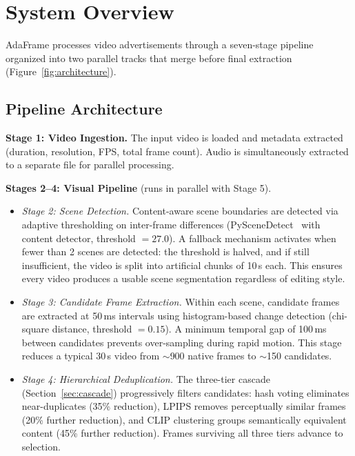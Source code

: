 \section{System Overview}
\label{sec:system_overview}

AdaFrame processes video advertisements through a seven-stage pipeline organized into two parallel tracks that merge before final extraction (Figure~\ref{fig:architecture}).

\subsection{Pipeline Architecture}

\textbf{Stage 1: Video Ingestion.} The input video is loaded and metadata extracted (duration, resolution, FPS, total frame count). Audio is simultaneously extracted to a separate file for parallel processing.

\textbf{Stages 2--4: Visual Pipeline} (runs in parallel with Stage 5).

\begin{itemize}
    \item \textit{Stage 2: Scene Detection.} Content-aware scene boundaries are detected via adaptive thresholding on inter-frame differences (PySceneDetect~\cite{cernekova2006entropy} with content detector, threshold $= 27.0$). A fallback mechanism activates when fewer than 2 scenes are detected: the threshold is halved, and if still insufficient, the video is split into artificial chunks of 10\,s each. This ensures every video produces a usable scene segmentation regardless of editing style.

    \item \textit{Stage 3: Candidate Frame Extraction.} Within each scene, candidate frames are extracted at 50\,ms intervals using histogram-based change detection (chi-square distance, threshold $= 0.15$). A minimum temporal gap of 100\,ms between candidates prevents over-sampling during rapid motion. This stage reduces a typical 30\,s video from $\sim$900 native frames to $\sim$150 candidates.

    \item \textit{Stage 4: Hierarchical Deduplication.} The three-tier cascade (Section~\ref{sec:cascade}) progressively filters candidates: hash voting eliminates near-duplicates (35\% reduction), LPIPS removes perceptually similar frames (20\% further reduction), and CLIP clustering groups semantically equivalent content (45\% further reduction). Frames surviving all three tiers advance to selection.
\end{itemize}


